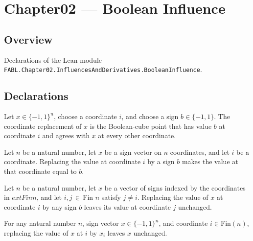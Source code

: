 \chapter{Chapter02 — Boolean Influence}
\section{Overview}

Declarations of the Lean module \texttt{FABL.Chapter02.InfluencesAndDerivatives.BooleanInfluence}.

\section{Declarations}

\begin{definition}
\label{FABL.setCoordinate}
\leanok
{}
Let $x\in\{-1,1\}^n$, choose a coordinate $i$, and choose a sign $b\in\{-1,1\}$. The
coordinate replacement of $x$ is the Boolean-cube point that has value $b$ at coordinate
$i$ and agrees with $x$ at every other coordinate.
\end{definition}

\begin{theorem}
\label{FABL.setCoordinate_apply_self}
\leanok
{}
Let $n$ be a natural number, let $x$ be a sign vector on $n$ coordinates, and let $i$ be
a coordinate. Replacing the value at coordinate $i$ by a sign $b$ makes the value at
that coordinate equal to $b$.
\end{theorem}

\begin{theorem}
\label{FABL.setCoordinate_apply_of_ne}
\leanok
{}
Let $n$ be a natural number, let $x$ be a vector of signs indexed by the coordinates in
$	ext{Fin }n$, and let $i,j \,\in\, \text{Fin }n$ satisfy $j \ne i$. Replacing the value
of $x$ at coordinate $i$ by any sign $b$ leaves its value at coordinate $j$ unchanged.
\end{theorem}

\begin{theorem}
\label{FABL.setCoordinate_eq_self}
\leanok
{}
For any natural number $n$, sign vector $x\in\{−1,1\}^{n}$, and coordinate
$i\in\mathrm{Fin}(n)$, replacing the value of $x$ at $i$ by $x_i$ leaves $x$ unchanged.
\end{theorem}

